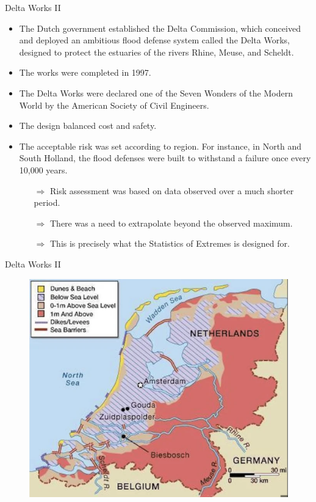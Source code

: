 \documentclass[10pt, hyperref={colorlinks = true,linkcolor = blue}]{beamer}
\begin{document}
{\begin{frame}{Delta Works II}
\begin{itemize}
    \item The Dutch government established the Delta Commission, which conceived and deployed an ambitious flood defense system called the Delta Works, designed to protect the estuaries of the rivers Rhine, Meuse, and Scheldt.
    \item The works were completed in 1997.
    \item The Delta Works were declared one of the Seven Wonders of the Modern World by the American Society of Civil Engineers.
    \item The design balanced cost and safety.
    \item The acceptable risk was set according to region. For instance, in North and South Holland, the flood defenses were built to withstand a failure once every 10,000 years.
    \begin{itemize}
        \item[$\Rightarrow$] Risk assessment was based on data observed over a much shorter period.
        \item[$\Rightarrow$] There was a need to extrapolate beyond the observed maximum.
        \item[$\Rightarrow$] This is precisely what the Statistics of Extremes is designed for.
    \end{itemize}
\end{itemize}
\end{frame}


\begin{frame}{Delta Works II}
\begin{figure}
\includegraphics[width=0.85\linewidth]{figures/deltaDam.png}
\end{figure}
\end{frame}

}
\end{document}
